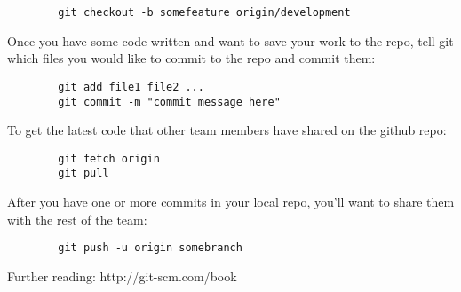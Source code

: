 \documentclass{article}
\begin{document}
	\begin{minipage}{0.95\textwidth}\begin{lstlisting}
	    git checkout -b somefeature origin/development
	\end{lstlisting}\end{minipage}

	Once you have some code written and want to save your work to the repo, tell git which files you would like to commit to the repo and commit them:
	
	\begin{minipage}{0.95\textwidth}\begin{lstlisting}
	    git add file1 file2 ...
	    git commit -m "commit message here"
	\end{lstlisting}\end{minipage}

	To get the latest code that other team members have shared on the github repo:

	\begin{minipage}{0.95\textwidth}\begin{lstlisting}
	    git fetch origin
	    git pull
	\end{lstlisting}\end{minipage}

	After you have one or more commits in your local repo, you'll want to share them with the rest of the team:

	\begin{minipage}{0.95\textwidth}\begin{lstlisting}
	    git push -u origin somebranch
	\end{lstlisting}\end{minipage}

	Further reading: http://git-scm.com/book
\end{document}
